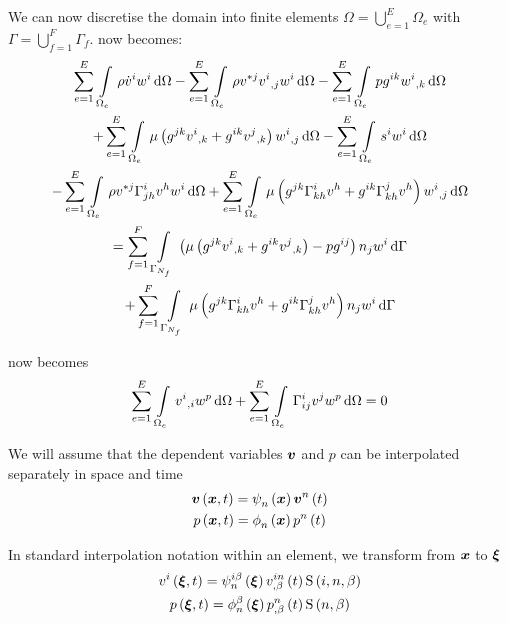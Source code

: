 We can now discretise the domain into finite elements \ie
$\Omega=\displaystyle{\bigcup_{e=1}^{E}}\Omega_{e}$ with
$\Gamma=\displaystyle{\bigcup_{f=1}^{F}}\Gamma_{f}$.  now
becomes:
\begin{multline}
  \gsum{e=1}{E}{\gint{\Omega_{e}}{}{\rho\dot{v}^{i}w^{i}}{\Omega}}
 -\gsum{e=1}{E}{\gint{\Omega_{e}}{}{\rho v^{*j}\partialderiv{v^{i}}{j}{w^{i}}}{\Omega}}
 -\gsum{e=1}{E}{\gint{\Omega_{e}}{}{pg^{ik}\partialderiv{w^{i}}{k}}{\Omega}}\\
 +\gsum{e=1}{E}{\gint{\Omega_{e}}{}{\mu\pbrac{g^{jk}\partialderiv{v^{i}}{k}+
       g^{ik}\partialderiv{v^{j}}{k}}\partialderiv{w^{i}}{j}}{\Omega}}
 -\gsum{e=1}{E}{\gint{\Omega_{e}}{}{s^{i}w^{i}}{\Omega}}\\
 -\gsum{e=1}{E}{\gint{\Omega_{e}}{}{\rho
     v^{*j}\christoffel{i}{j}{h}v^{h}w^{i}}{\Omega}}
 +\gsum{e=1}{E}{\gint{\Omega_{e}}{}{\mu\pbrac{g^{jk}\christoffel{i}{k}{h}v^{h}+
     g^{ik}\christoffel{j}{k}{h}v^{h}}\partialderiv{w^{i}}{j}}{\Omega}}\\
 =\gsum{f=1}{F}{\gint{\Gamma_{N_{f}}}{}{\pbrac{\mu\pbrac{g^{jk}\partialderiv{v^{i}}{k}+
         g^{ik}\partialderiv{v^{j}}{k}}-pg^{ij}}n_{j}w^{i}}{\Gamma}}\\
 +\gsum{f=1}{F}{\gint{\Gamma_{N_{f}}}{}{\mu\pbrac{g^{jk}\christoffel{i}{k}{h}v^{h}+
       g^{ik}\christoffel{j}{k}{h}v^{h}}n_{j}w^{i}}{\Gamma}}
 \label{eqn:FEMStokesEquationMomentum}
\end{multline}

 now becomes
\begin{equation}
  \gsum{e=1}{E}{\gint{\Omega_{e}}{}{\partialderiv{v^{i}}{i}w^{p}}{\Omega}}
  +\gsum{e=1}{E}{\gint{\Omega_{e}}{}{\christoffel{i}{i}{j}v^{j}w^{p}}{\Omega}}=0
  \label{eqn:FEMStokesEquationMass}
\end{equation}

We will assume that the dependent variables $\vectr{v}$ and $p$ can be
interpolated separately in space and time \ie
\begin{gather}
  \fnof{\vectr{v}}{\vectr{x},t}=\gbfn{n}{}{\vectr{x}}\fnof{\nodept{\vectr{v}}{n}}{t}\\
  \fnof{p}{\vectr{x},t}=\altgbfn{n}{}{\vectr{x}}\fnof{\nodept{p}{n}}{t}
\end{gather}

In standard interpolation notation within an element, we transform from
$\vectr{x}$ to $\vectr{\xi}$ \ie
\begin{gather}
  \fnof{v^{i}}{\vectr{\xi},t}=\idxgbfn{i}{n}{\beta}{\vectr{\xi}}
  \fnof{\idxnodedof{v}{i}{n}{\beta}}{t}\idxgsf{i}{n}{\beta}\\
  \fnof{p}{\vectr{\xi},t}=\altgbfn{n}{\beta}{\vectr{\xi}}
  \fnof{\nodedof{p}{n}{\beta}}{t}\gsf{n}{\beta}
\end{gather}

